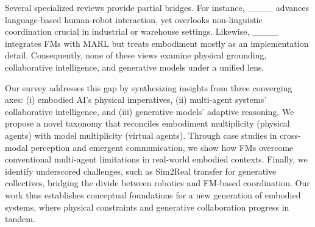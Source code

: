 Several specialized reviews provide partial bridges. 
For instance, ____ advances language-based human-robot interaction, yet overlooks non-linguistic coordination crucial in industrial or warehouse settings. 
Likewise, ____ integrates FMs with MARL but treats embodiment mostly as an implementation detail. 
Consequently, none of these views examine physical grounding, collaborative intelligence, and generative models under a unified lens.

Our survey addresses this gap by synthesizing insights from three converging axes: 
(i) embodied AI’s physical imperatives, 
(ii) multi-agent systems’ collaborative intelligence, and 
(iii) generative models’ adaptive reasoning. 
We propose a novel taxonomy that reconciles embodiment multiplicity (physical agents) with model multiplicity (virtual agents). 
Through case studies in cross-modal perception and emergent communication, we show how FMs overcome conventional multi-agent limitations in real-world embodied contexts. 
Finally, we identify underscored challenges, such as Sim2Real transfer for generative collectives, bridging the divide between robotics and FM-based coordination. 
Our work thus establishes conceptual foundations for a new generation of embodied systems, where physical constraints and generative collaboration progress in tandem.

%